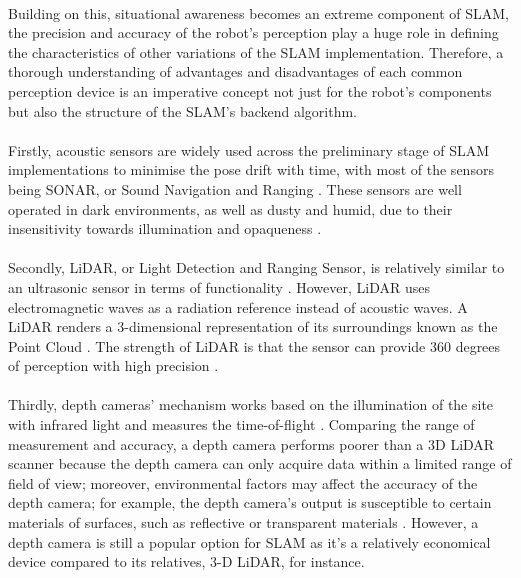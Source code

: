 \paragraph*{}
Building on this, situational awareness becomes an extreme component of SLAM, the precision and accuracy of the robot's perception play a huge role in defining the characteristics of other variations of the SLAM implementation. Therefore, a thorough understanding of advantages and disadvantages of each common perception device is an imperative concept not just for the robot’s components but also the structure of the SLAM’s backend algorithm. 

\paragraph*{}
Firstly, acoustic sensors are widely used across the preliminary stage of SLAM implementations to minimise the pose drift with time, with most of the sensors being SONAR, or Sound Navigation and Ranging \cite{udugama2023evolution}. These sensors are well operated in dark environments, as well as dusty and humid, due to their insensitivity towards illumination and opaqueness \cite{sahoo2019advancements}. 

\paragraph*{}
Secondly, LiDAR, or Light Detection and Ranging Sensor, is relatively similar to an ultrasonic sensor in terms of functionality \cite{udugama2023evolution}. However, LiDAR uses electromagnetic waves as a radiation reference instead of acoustic waves. A LiDAR renders a 3-dimensional representation of its surroundings known as the Point Cloud \cite{bisheng2017progress}. The strength of LiDAR is that the sensor can provide 360 degrees of perception with high precision \cite{cadena2016past}.

\paragraph*{}
Thirdly, depth cameras' mechanism works based on the illumination of the site with infrared light and measures the time-of-flight \cite{langmann2012depth}. Comparing the range of measurement and accuracy, a depth camera performs poorer than a 3D LiDAR scanner because the depth camera can only acquire data within a limited range of field of view; moreover, environmental factors may affect the accuracy of the depth camera; for example, the depth camera’s output is susceptible to certain materials of surfaces, such as reflective or transparent materials \cite{peng2023depth}. However, a depth camera is still a popular option for SLAM as it's a relatively economical device compared to its relatives, 3-D LiDAR, for instance.

